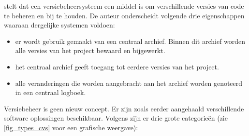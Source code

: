\textcite{Loeliger2009} stelt dat een versiebeheersysteem een middel is om verschillende versies van code te beheren en bij te houden. De auteur onderscheidt volgende drie eigenschappen waaraan dergelijke systemen voldoen:

\begin{itemize}
	\item er wordt gebruik gemaakt van een centraal archief. Binnen dit archief worden alle versies van het project bewaard en bijgewerkt.
	\item het centraal archief geeft toegang tot eerdere versies van het project.
	\item alle veranderingen die worden aangebracht aan het archief worden genoteerd in een centraal logboek.
\end{itemize}

Versiebeheer is geen nieuw concept. Er zijn zoals eerder aangehaald verschillende software oplossingen beschikbaar. Volgens \textcite{Chacon2014} zijn er drie grote categorieën (zie \ref{fig_types_cvs} voor een grafische weergave):

